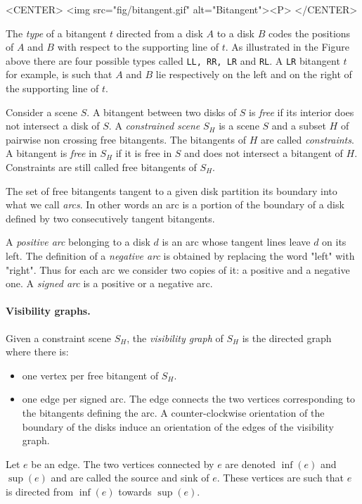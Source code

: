 \begin{ccHtmlOnly}
    <CENTER>
        <img src="fig/bitangent.gif" alt="Bitangent"><P>
    </CENTER>
\end{ccHtmlOnly}

The \emph{type} of a bitangent $t$ directed from a disk $A$ to a disk $B$ codes
the positions of $A$ and $B$ with respect to the supporting line of $t$. As
illustrated in the Figure above there are four possible types called \texttt{LL,
RR, LR} and \texttt{RL}. A \texttt{LR} bitangent $t$ for example, is such that
$A$ and $B$ lie respectively on the left and on the right of the supporting line
of $t$. 

Consider a scene $S$. A bitangent between two disks of $S$ is \emph{free} if its
interior does not intersect a disk of $S$.  A \emph{constrained scene} $S_H$ is
a scene $S$ and a subset $H$ of pairwise non crossing free bitangents. The
bitangents of $H$ are called \emph{constraints}. A bitangent is \emph{free} in
$S_H$ if it is free in $S$ and does not intersect a bitangent of $H$.
Constraints are still called free bitangents of $S_H$.

The set of free bitangents tangent to a given disk partition its boundary into
what we call \emph{arcs}. In other words an arc is a portion of the boundary of
a disk defined by two consecutively tangent bitangents.

A \emph{positive arc} belonging to a disk $d$ is an arc whose tangent lines leave 
$d$ on its left. The definition of a \emph{negative arc} is obtained by
replacing the word "left" with "right". Thus for each arc we consider two
copies of it: a positive and a negative one. A \emph{signed arc} is a positive
or a negative arc.

\paragraph{Visibility graphs. }
Given a constraint scene $S_H$, the \emph{visibility graph} of $S_H$ is the
directed graph where there is:
\begin{itemize}
    \item one vertex per free bitangent of $S_H$.
    \item one edge per signed arc. The edge connects the two vertices
    corresponding to the bitangents defining the arc. A counter-clockwise
    orientation of the boundary of the disks induce an orientation of the edges
    of the visibility graph.
\end{itemize}
Let $e$ be an edge. The two vertices connected by $e$ are denoted $\inf(e)$ and
$\sup(e)$ and are called the source and sink of $e$. These vertices are such
that $e$ is directed from $\inf(e)$ towards $\sup(e)$.

